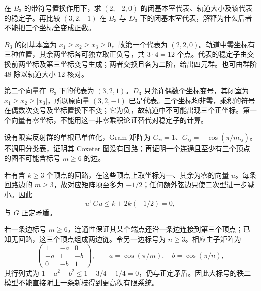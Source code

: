 \begin{exercise}\label{g1:ex:reflection-boundary-orbits}
	在 \(B_3\) 的带符号置换作用下，求 \((2,-2,0)\) 的闭基本室代表、轨道大小及该代表的稳定子。再比较 \((3,2,-1)\) 在 \(B_3\) 与 \(D_3\) 下的闭基本室代表，解释为什么后者不能把三个坐标全变成正数。
\end{exercise}
\begin{solution}
	\(B_3\) 的闭基本室为 \(x_1\ge x_2\ge x_3\ge0\)，故第一个代表为 \((2,2,0)\)。轨道中零坐标有三种位置，其余两坐标各可独立取正负号，共 \(3\cdot4=12\) 个点。代表的稳定子由交换前两坐标及第三坐标变号生成；两者交换且各为二阶，给出四元群。也可由群阶 \(48\) 除以轨道大小 \(12\) 核对。

	第二个向量在 \(B_3\) 下的代表为 \((3,2,1)\)。\(D_3\) 只允许偶数个坐标变号，其闭室为 \(x_1\ge x_2\ge|x_3|\)，所以原向量 \((3,2,-1)\) 已是代表。三个坐标均非零，乘积的符号在偶数次变号及坐标置换下不变；它为负，故轨道中不可能出现三个正坐标。第一个向量有零坐标，不能用这一非零乘积论证替代对稳定子的计算。
\end{solution}

\begin{exercise}\label{g1:ex:coxeter-positive-matrix-obstructions}
	设有限实反射群的单根已单位化，Gram 矩阵为 \(G_{ii}=1\)、\(G_{ij}=-\cos(\pi/m_{ij})\)。不调用分类表，证明其 Coxeter 图没有回路；再证明一个连通且至少有三个顶点的图不可能含标号 \(m\ge6\) 的边。
\end{exercise}
\begin{solution}
	若有含 \(k\ge3\) 个顶点的回路，在这些顶点上取坐标为一、其余为零的向量 \(u\)。每条回路边的 \(m\ge3\)，故对应矩阵项至多为 \(-1/2\)；任何额外弦边只使二次型进一步减小。因此
	\[
		u^{\mathsf T}Gu\le k+2k(-1/2)=0,
	\]
	与 \(G\) 正定矛盾。

	若一条边标号 \(m\ge6\)，连通性保证其某个端点还沿一条边连接到第三个顶点；已知无回路，这三个顶点组成两边链。令另一边标号为 \(n\ge3\)。相应主子矩阵为
	\[
		\begin{pmatrix}1&-a&0\\-a&1&-b\\0&-b&1\end{pmatrix},
		\qquad a=\cos(\pi/m),\quad b=\cos(\pi/n),
	\]
	其行列式为 \(1-a^2-b^2\le1-3/4-1/4=0\)，仍与正定矛盾。因此大标号的秩二模型不能直接附上一条新枝得到更高秩有限系统。
\end{solution}


